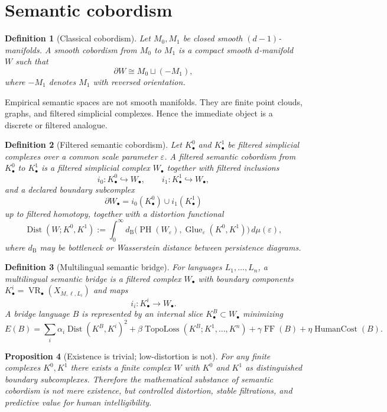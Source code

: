 \documentclass[11pt]{article}
\newtheorem{definition}{Definition}[section]
\newtheorem{proposition}[definition]{Proposition}
\newcommand{\VR}{\operatorname{VR}}
\newcommand{\FF}{\operatorname{FF}}
\newcommand{\Dist}{\operatorname{Dist}}
\newcommand{\eps}{\varepsilon}
\newcommand{\bd}{\partial}
\begin{document}
\section{Semantic cobordism}

\begin{definition}[Classical cobordism]
Let $M_0,M_1$ be closed smooth $(d-1)$-manifolds.  A smooth cobordism from $M_0$ to $M_1$ is a compact smooth $d$-manifold $W$ such that
\[
  \bd W\cong M_0\sqcup (-M_1),
\]
where $-M_1$ denotes $M_1$ with reversed orientation.
\end{definition}

Empirical semantic spaces are not smooth manifolds.  They are finite point clouds, graphs, and filtered simplicial complexes.  Hence the immediate object is a discrete or filtered analogue.

\begin{definition}[Filtered semantic cobordism]
Let $K^0_\bullet$ and $K^1_\bullet$ be filtered simplicial complexes over a common scale parameter $\eps$.  A filtered semantic cobordism from $K^0_\bullet$ to $K^1_\bullet$ is a filtered simplicial complex $W_\bullet$ together with filtered inclusions
\[
  i_0:K^0_\bullet\hookrightarrow W_\bullet,
  \qquad
  i_1:K^1_\bullet\hookrightarrow W_\bullet,
\]
and a declared boundary subcomplex
\[
  \bd W_\bullet=i_0(K^0_\bullet)\cup i_1(K^1_\bullet)
\]
up to filtered homotopy, together with a distortion functional
\[
  \Dist(W;K^0,K^1)
  :=
  \int_0^\infty d_{\operatorname{B}}\big(\operatorname{PH}(W_\eps),\operatorname{Glue}_\eps(K^0,K^1)\big)\,d\mu(\eps),
\]
where $d_{\operatorname{B}}$ may be bottleneck or Wasserstein distance between persistence diagrams.
\end{definition}

\begin{definition}[Multilingual semantic bridge]
For languages $L_1,\dots,L_n$, a multilingual semantic bridge is a filtered complex $W_\bullet$ with boundary components $K^i_\bullet=\VR_\bullet(X_{M,\ell,L_i})$ and maps
\[
  i_i:K^i_\bullet\to W_\bullet.
\]
A bridge language $B$ is represented by an internal slice $K^B_\bullet\subset W_\bullet$ minimizing
\[
  E(B)=\sum_i \alpha_i\Dist(K^B,K^i)^2
       +\beta\operatorname{TopoLoss}(K^B;K^1,\dots,K^n)
       +\gamma\FF(B)
       +\eta\operatorname{HumanCost}(B).
\]
\end{definition}

\begin{proposition}[Existence is trivial; low-distortion is not]
For any finite complexes $K^0,K^1$ there exists a finite complex $W$ with $K^0$ and $K^1$ as distinguished boundary subcomplexes.  Therefore the mathematical substance of semantic cobordism is not mere existence, but controlled distortion, stable filtrations, and predictive value for human intelligibility.
\end{proposition}
\end{document}
